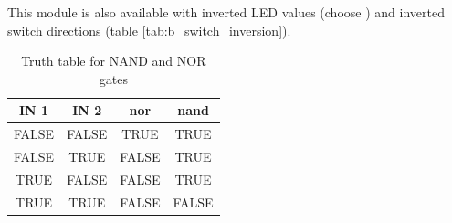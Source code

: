 \documentclass[a4paper]{report}
\begin{document}
This module is also available with inverted LED values (choose \ledInversionNumbers ) and inverted switch directions (table \ref{tab:b_switch_inversion}).

\begin{table}
	\centering
	\begin{tabular}{|cc|cc|}\hline
		IN 1 & IN 2 & nor & nand \\\hline
		FALSE & FALSE & TRUE & TRUE \\
		FALSE & TRUE & FALSE & TRUE \\
		TRUE & FALSE & FALSE & TRUE \\
		TRUE & TRUE & FALSE & FALSE \\\hline
	\end{tabular}
	\caption{Truth table for NAND and NOR gates}
	\label{tab:b_truthtable}
\end{table}


\end{document}
